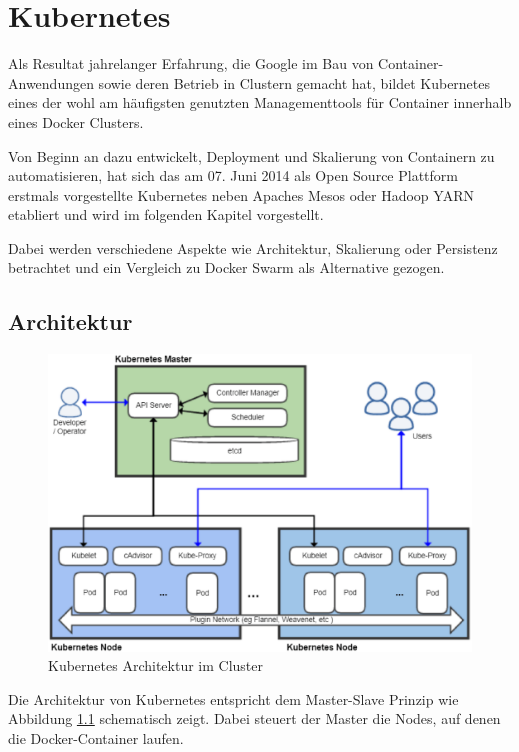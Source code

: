 \chapter{Kubernetes}
\label{c:kubernetes}

Als Resultat jahrelanger Erfahrung, die Google im Bau von Container-Anwendungen sowie deren Betrieb in Clustern gemacht hat, bildet Kubernetes eines der wohl am häufigsten genutzten Managementtools für Container innerhalb eines Docker Clusters.

Von Beginn an dazu entwickelt, Deployment und Skalierung von Containern zu automatisieren, hat sich das am 07. Juni 2014 als Open Source Plattform erstmals vorgestellte Kubernetes neben Apaches Mesos oder Hadoop YARN etabliert und wird im folgenden Kapitel vorgestellt.

Dabei werden verschiedene Aspekte wie Architektur, Skalierung oder Persistenz betrachtet und ein Vergleich zu Docker Swarm als Alternative gezogen.


\section{Architektur}
\begin{figure}
	\centering
	\includegraphics[width=0.9\linewidth]{figures/kubernetes-architecture}
	\caption[Kubernetes Cluster Architektur]{Kubernetes Architektur im Cluster}
	\label{fig:kubernetes-architecture}
\end{figure}
Die Architektur von Kubernetes entspricht dem Master-Slave Prinzip wie Abbildung \ref{fig:kubernetes-architecture} schematisch zeigt.
Dabei steuert der Master die Nodes, auf denen die Docker-Container laufen.

